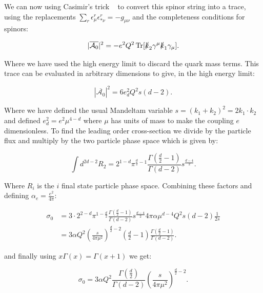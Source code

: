 	We can now using Casimir's trick ~\cite{griff} to convert this spinor string into a trace, using the replacements
	$\sum_r\epsilon^r_\mu\epsilon^r_{*\nu}=-g_{\mu\nu}$ and the completeness conditions for spinors:

	\begin{equation}
	|\overline{\mathcal{A}_0}|^2 = - e^2Q^2\operatorname{Tr}[\slashed k_2\gamma^\mu\slashed k_1\gamma_\mu].
	\end{equation}

	Where we have used the high energy limit to discard the quark mass terms.  This trace can be evaluated in arbitrary
	dimensions to give, in the high energy limit:

	\begin{equation}
	|\overline{\mathcal{A}_0}|^2 = 6e_d^2Q^2s(d-2).
	\end{equation}

	Where we have defined the usual Mandeltam variable $s=(k_1+k_2)^2=2k_1\cdot k_2$ and defined $e_d^2=e^2\mu^{4-d}$ where
	$\mu$ has units of mass to make the coupling $e$ dimensionless.  To find the leading order cross-section we divide by the
	particle flux and multiply by the two particle phase space which is given by:

	\begin{equation}
	\int d^{2d-2}R_2 = 2^{1-d}\pi^{\frac{d}{2}-1}\frac{\Gamma(\frac{d}{2}-1)}{\Gamma(d-2)}s^\frac{d-4}{2}.
	\end{equation}

	Where $R_i$ is the $i$ final state particle phase space.  Combining these factors and defining $\alpha_e=\frac{e^2}{4\pi}$:

	\begin{equation}
	\begin{split}
	\sigma_0 &= 3\cdot2^{2-d}\pi^{1-\frac{d}{2}}\frac{\Gamma(\frac{d}{2}-1)}{\Gamma(d-2)}s^\frac{d-4}{2}4\pi\alpha\mu^{d-4}Q^2s(d-2)\frac{1}{2s} \\
	&= 3\alpha Q^2\left(\frac{s}{4\pi\mu^2}\right)^{\frac{d}{2}-2}\left(\frac{d}{2}-1\right)\frac{\Gamma(\frac{d}{2}-1)}{\Gamma(d-2)}.
	\end{split}
	\end{equation}

	and finally using $x\Gamma(x)=\Gamma(x+1)$ we get:

	\begin{equation}
	\sigma_0 = 3\alpha Q^2 \frac{\Gamma(\frac{d}{2})}{\Gamma(d-2)}\left(\frac{s}{4\pi\mu^2}\right)^{\frac{d}{2}-2}.
	\end{equation}

